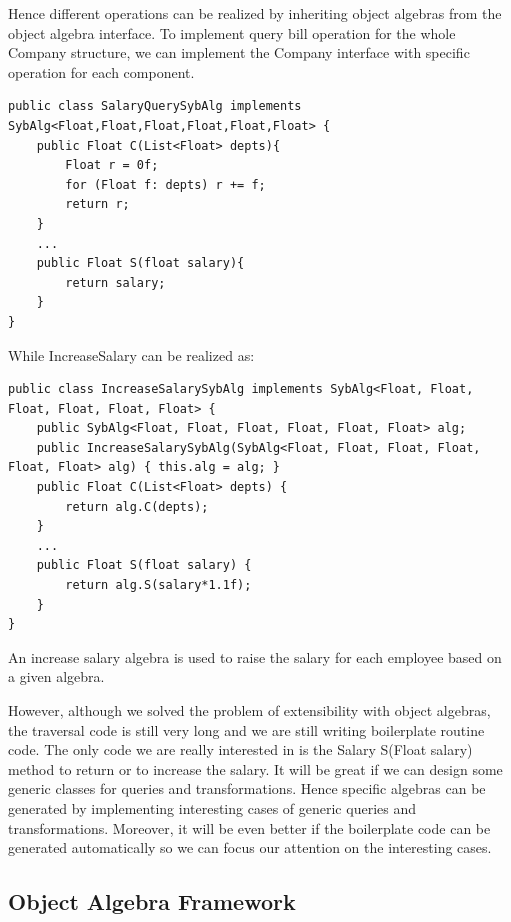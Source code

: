 Hence different operations can be realized by inheriting object
algebras from the object algebra interface. To implement query bill
operation for the whole Company structure, we can implement the
Company interface with specific operation for each component.

\begin{lstlisting}[numbers=none] 
public class SalaryQuerySybAlg implements SybAlg<Float,Float,Float,Float,Float,Float> {
	public Float C(List<Float> depts){
		Float r = 0f;
		for (Float f: depts) r += f;
		return r;
	}
	...
	public Float S(float salary){
		return salary;
	}
}
\end{lstlisting}

While IncreaseSalary can be realized as: 

\begin{lstlisting}[numbers=none]
public class IncreaseSalarySybAlg implements SybAlg<Float, Float, Float, Float, Float, Float> {
	public SybAlg<Float, Float, Float, Float, Float, Float> alg;
	public IncreaseSalarySybAlg(SybAlg<Float, Float, Float, Float, Float, Float> alg) { this.alg = alg; }
	public Float C(List<Float> depts) {
		return alg.C(depts);
	}
	...
	public Float S(float salary) {
		return alg.S(salary*1.1f);
	}
}
\end{lstlisting}

An increase salary algebra is used to raise the salary for each employee based on a given algebra. 

However, although we solved the problem of extensibility with object
algebras, the traversal code is still very long and we are still
writing boilerplate routine code. The only code we are really interested in is the
Salary S(Float salary) method to return or to increase the salary. It
will be great if we can design some generic classes for queries and
transformations. Hence specific algebras can be generated by
implementing interesting cases of generic queries and
transformations. Moreover, it will be even better if the boilerplate
code can be generated automatically so we can focus our attention on
the interesting cases.

\subsection{Object Algebra Framework}

